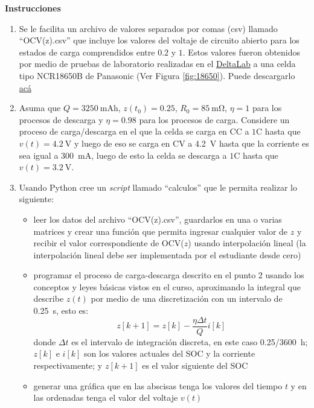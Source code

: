 \documentclass[12pt]{article}
\begin{document}
\textbf{Instrucciones}
\begin{enumerate}
    \item Se le facilita un archivo de valores separados por comas (csv) llamado ``OCV(z).csv'' que incluye los valores del voltaje de circuito abierto para los estados de carga comprendidos entre $0.2$ y $1$. Estos valores fueron obtenidos por medio de pruebas de laboratorio realizadas en el \href{https://www.tec.ac.cr/unidades/laboratorio-delta}{DeltaLab} a una celda tipo NCR18650B de Panasonic (Ver Figura \ref{fig:18650}). Puede descargarlo \href{https://estudianteccr-my.sharepoint.com/:x:/g/personal/prof_juan_rojas_estudiantec_cr/EaWEaD9eY35Clh4iO77cZ5YBe0Tf2joTGQHzCdW8IVIatA?e=91HoDB}{acá}
    \item Asuma que $Q = \SI{3250}{\milli\ampere\hour}$, $z(t_0) = 0.25$, $R_0 = \SI{85}{\milli\ohm}$, $\eta = 1$ para los procesos de descarga y $\eta = 0.98$ para los procesos de carga. Considere un proceso de carga/descarga en el que la celda se carga en CC a $1$C hasta que $v(t)=\SI{4.2}{\volt}$ y luego de eso se carga en CV a \SI{4.2}{\volt} hasta que la corriente es sea igual a \SI{300}{\milli\ampere}, luego de esto la celda se descarga a $1$C hasta que $v(t)=\SI{3.2}{\volt}$.
    \item Usando Python cree un \emph{script} llamado ``calculos'' que le permita realizar lo siguiente:
    \begin{itemize}
        \item leer los datos del archivo ``OCV(z).csv'', guardarlos en una o varias matrices y crear una función que permita ingresar cualquier valor de $z$ y recibir el valor correspondiente de OCV($z$) usando interpolación lineal (la interpolación lineal debe ser implementada por el estudiante desde cero) 
        \item programar el proceso de carga-descarga descrito en el punto 2 usando los conceptos y leyes básicas vistos en el curso, aproximando la integral que describe $z(t)$ por medio de una discretización con un intervalo de \SI{0.25}{\second}, esto es: 
        \begin{equation*}
            z[k+1] = z[k] - \dfrac{\eta \Delta t}{Q}i[k]
        \end{equation*}
        donde $\Delta t$ es el intervalo de integración discreta, en este caso \SI{0.25/3600}{\hour}; $z[k]$ e $i[k]$ son los valores actuales del SOC y la corriente respectivamente; y $z[k+1]$ es el valor siguiente del SOC
        \item generar una gráfica que en las abscisas tenga los valores del tiempo $t$ y en las ordenadas tenga el valor del voltaje $v(t)$

\end{itemize}
\end{enumerate}
\end{document}
